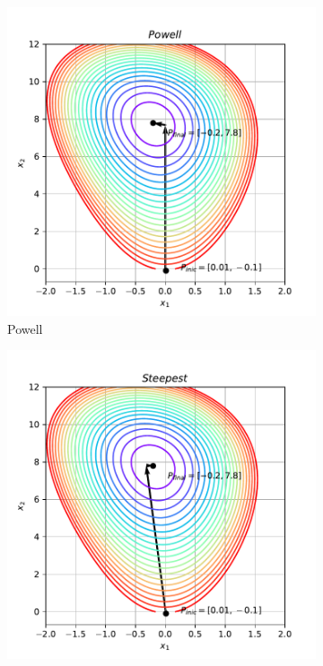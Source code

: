 \documentclass[10pt, a4paper]{article}
\begin{document}
\begin{figure}[htpb]
\begin{subfigure}[b]{0.32\textwidth}
    \includegraphics[width=\textwidth]{images/q2a_Powell.pdf}
    \caption{Powell}
    \label{fig:q2a_powell}
  \end{subfigure}
  \hfill
  \begin{subfigure}[b]{0.32\textwidth}
    \centering
    \includegraphics[width=\textwidth]{images/q2a_Steepest.pdf}

\end{subfigure}
\end{figure}
\end{document}
